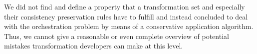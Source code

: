 We did not find and define a property that a transformation set and especially their consistency preservation rules have to fulfill and instead concluded to deal with the orchestration problem by means of a conservative application algorithm.
Thus, we cannot give a reasonable or even complete overview of potential mistakes transformation developers can make at this level.


%     

